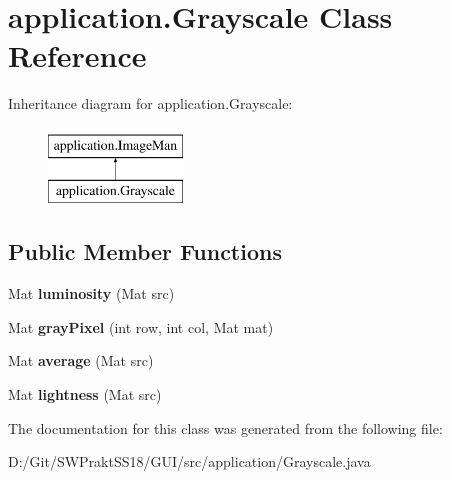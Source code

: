 \hypertarget{classapplication_1_1_grayscale}{}\section{application.\+Grayscale Class Reference}
\label{classapplication_1_1_grayscale}
Inheritance diagram for application.\+Grayscale\+:\begin{figure}[H]
\begin{center}
\leavevmode
\includegraphics[height=2.000000cm]{classapplication_1_1_grayscale}
\end{center}
\end{figure}
\subsection*{Public Member Functions}
\begin{DoxyCompactItemize}
\item 
\mbox{\label{classapplication_1_1_grayscale_a6bf7ea7c89bcc25fa1f2ef43583a3bdb}} 
Mat {\bfseries luminosity} (Mat src)
\item 
\mbox{\label{classapplication_1_1_grayscale_a4fecb13f22f5d72062ce164cf0a491ed}} 
Mat {\bfseries gray\+Pixel} (int row, int col, Mat mat)
\item 
\mbox{\label{classapplication_1_1_grayscale_a3ef991beb69461c85a1c6bbf706e0605}} 
Mat {\bfseries average} (Mat src)
\item 
\mbox{\label{classapplication_1_1_grayscale_a7b371c1462bfa33b5cf1b491cead7ba4}} 
Mat {\bfseries lightness} (Mat src)
\end{DoxyCompactItemize}


The documentation for this class was generated from the following file\+:\begin{DoxyCompactItemize}
\item 
D\+:/\+Git/\+S\+W\+Prakt\+S\+S18/\+G\+U\+I/src/application/Grayscale.\+java\end{DoxyCompactItemize}
